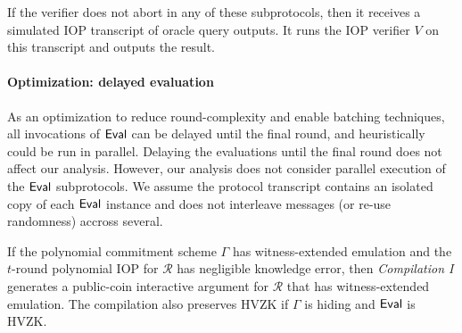 If the verifier does not abort in any of these subprotocols, then it receives a simulated IOP transcript of oracle query outputs. It runs the IOP verifier $V$ on this transcript and outputs the result. 

\paragraph{Optimization: delayed evaluation} As an optimization to reduce round-complexity and enable batching techniques, all invocations of $\textsf{{Eval}}$ can be delayed until the final round, and heuristically could be run in parallel. Delaying the evaluations until the final round does not affect our analysis. However, our analysis does not consider parallel execution of the $\textsf{{Eval}}$ subprotocols. We assume the protocol transcript contains an isolated copy of each $\textsf{{Eval}}$ instance and does not interleave messages (or re-use randomness) accross several. 

\begin{lemma}\label{lem:IOPcompiler}
If the polynomial commitment scheme $\Gamma$ has witness-extended emulation and the $t$-round polynomial IOP for $\mathcal{R}$ has negligible knowledge error, then \emph{Compilation I} generates a public-coin interactive argument for $\mathcal{R}$ that has witness-extended emulation. The compilation also preserves HVZK if $\Gamma$ is hiding and $\textsf{{Eval}}$ is HVZK. 
\end{lemma}

